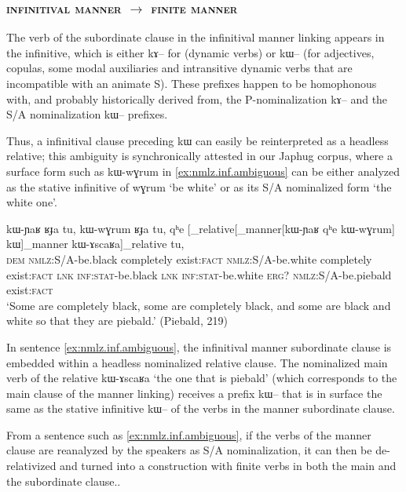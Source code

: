 \documentclass[oldfontcommands,oneside,a4paper,11pt]{article}
\newcommand{\ipa}[1]{{\phon #1}} %
\begin{document}
 
  \subsubsection{\textsc{infinitival manner} $\rightarrow$ \textsc{finite manner}}

The verb of the subordinate clause in the infinitival manner linking appears in the infinitive, which is either \ipa{kɤ--} for (dynamic verbs) or \ipa{kɯ--} (for adjectives, copulas, some modal auxiliaries and intransitive dynamic verbs that are incompatible with an animate S). These prefixes happen to be homophonous with, and probably historically derived from, the P-nominalization \ipa{kɤ--} and the S/A nominalization \ipa{kɯ--} prefixes.

Thus, a infinitival clause preceding \ipa{kɯ} can easily be reinterpreted as a headless relative; this ambiguity is synchronically attested in our Japhug corpus, where a surface form such as \ipa{kɯ-wɣrum} in \ref{ex:nmlz.inf.ambiguous} can be either analyzed as the stative infinitive of \ipa{wɣrum} `be white' or as its S/A nominalized form `the white one'.
 
 \begin{exe}
\ex \label{ex:nmlz.inf.ambiguous}
\gll \ipa{nɯnɯ}  	\ipa{kɯ-ɲaʁ}  	\ipa{ʁɟa}  	\ipa{tu,}  	\ipa{kɯ-wɣrum}  	\ipa{ʁɟa}  	\ipa{tu,}   \ipa{qʰe}  	[_{relative}[_{manner}[\ipa{kɯ-ɲaʁ}  	\ipa{qʰe}  	\ipa{kɯ-wɣrum}]  	\ipa{kɯ}]_{manner}   	\ipa{kɯ-ɤscaʁa}]_{relative}  	\ipa{tu,}  \\
\textsc{dem} \textsc{nmlz}:S/A-be.black completely exist:\textsc{fact} 
\textsc{nmlz}:S/A-be.white completely exist:\textsc{fact} 
\textsc{lnk}   \textsc{inf:stat}-be.black \textsc{lnk} \textsc{inf:stat}-be.white \textsc{erg?} \textsc{nmlz}:S/A-be.piebald  exist:\textsc{fact} \\
\glt `Some are completely black, some are completely black, and some are black and white so that they are piebald.' (Piebald,  219)
\end{exe}

In sentence \ref{ex:nmlz.inf.ambiguous}, the infinitival manner subordinate clause is embedded within a headless nominalized relative clause. The nominalized main verb of the relative \ipa{kɯ-ɤscaʁa} `the one that is piebald' (which corresponds to the main clause of the manner linking) receives a prefix \ipa{kɯ--} that is in surface the same as the stative infinitive \ipa{kɯ--} of the verbs in the manner subordinate clause.

From a sentence such as \ref{ex:nmlz.inf.ambiguous}, if the verbs of the manner clause are reanalyzed by the speakers as S/A nominalization, it can then be de-relativized and turned into a construction with finite verbs in both the main and the subordinate clause.. 
\end{document}
